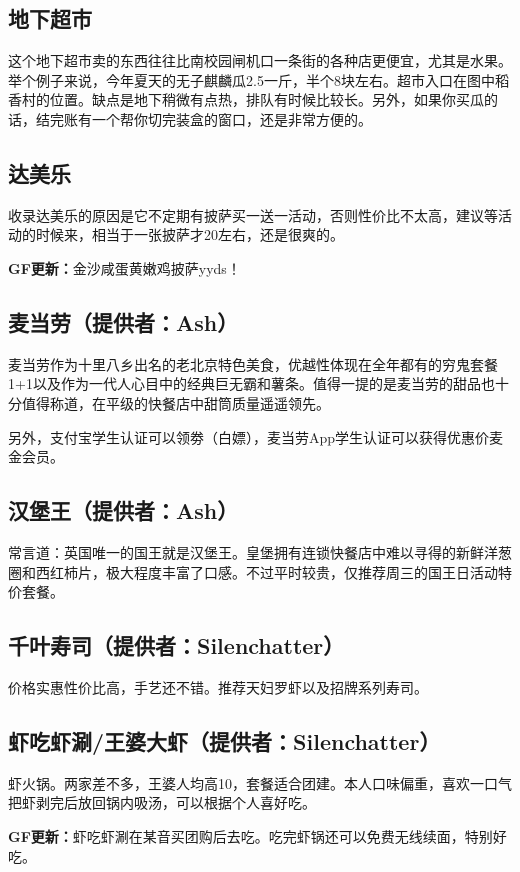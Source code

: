 \documentclass[lang=cn,color=blue,12pt,scheme=chinese,chinesefont=nofont]{elegantbook}
\begin{document}
\subsection{地下超市}
这个地下超市卖的东西往往比南校园闸机口一条街的各种店更便宜，尤其是水果。举个例子来说，今年夏天的无子麒麟瓜2.5一斤，半个8块左右。超市入口在图中稻香村的位置。缺点是地下稍微有点热，排队有时候比较长。另外，如果你买瓜的话，结完账有一个帮你切完装盒的窗口，还是非常方便的。

\subsection{达美乐}
收录达美乐的原因是它不定期有披萨买一送一活动，否则性价比不太高，建议等活动的时候来，相当于一张披萨才20左右，还是很爽的。

\textbf{GF更新：}金沙咸蛋黄嫩鸡披萨yyds！

\subsection{麦当劳（提供者：Ash）}
麦当劳作为十里八乡出名的老北京特色美食，优越性体现在全年都有的穷鬼套餐1+1以及作为一代人心目中的经典巨无霸和薯条。值得一提的是麦当劳的甜品也十分值得称道，在平级的快餐店中甜筒质量遥遥领先。

另外，支付宝学生认证可以领劵（白嫖），麦当劳App学生认证可以获得优惠价麦金会员。

\subsection{汉堡王（提供者：Ash）}
常言道：英国唯一的国王就是汉堡王。皇堡拥有连锁快餐店中难以寻得的新鲜洋葱圈和西红柿片，极大程度丰富了口感。不过平时较贵，仅推荐周三的国王日活动特价套餐。

\subsection{千叶寿司（提供者：Silenchatter）}
价格实惠性价比高，手艺还不错。推荐天妇罗虾以及招牌系列寿司。

\subsection{虾吃虾涮/王婆大虾（提供者：Silenchatter）}
虾火锅。两家差不多，王婆人均高10，套餐适合团建。本人口味偏重，喜欢一口气把虾剥完后放回锅内吸汤，可以根据个人喜好吃。

\textbf{GF更新：}虾吃虾涮在某音买团购后去吃。吃完虾锅还可以免费无线续面，特别好吃。
\end{document}
